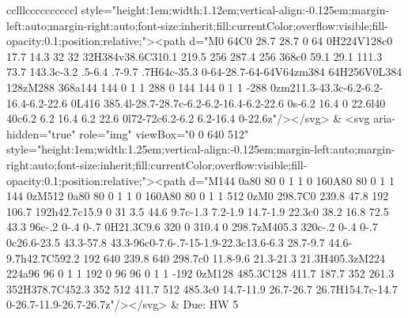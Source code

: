 \documentclass[
]{article}
\begin{document}
\begin{figure*}
\begin{longtable*}{cclllccccccccccl}
style="height:1em;width:1.12em;vertical-align:-0.125em;margin-left:auto;margin-right:auto;font-size:inherit;fill:currentColor;overflow:visible;fill-opacity:0.1;position:relative;"><path d="M0 64C0 28.7 28.7 0 64 0H224V128c0 17.7 14.3 32 32 32H384v38.6C310.1 219.5 256 287.4 256 368c0 59.1 29.1 111.3 73.7 143.3c-3.2 .5-6.4 .7-9.7 .7H64c-35.3 0-64-28.7-64-64V64zm384 64H256V0L384 128zM288 368a144 144 0 1 1 288 0 144 144 0 1 1 -288 0zm211.3-43.3c-6.2-6.2-16.4-6.2-22.6 0L416 385.4l-28.7-28.7c-6.2-6.2-16.4-6.2-22.6 0s-6.2 16.4 0 22.6l40 40c6.2 6.2 16.4 6.2 22.6 0l72-72c6.2-6.2 6.2-16.4 0-22.6z"/></svg> & <svg aria-hidden="true" role="img" viewBox="0 0 640 512" style="height:1em;width:1.25em;vertical-align:-0.125em;margin-left:auto;margin-right:auto;font-size:inherit;fill:currentColor;overflow:visible;fill-opacity:0.1;position:relative;"><path d="M144 0a80 80 0 1 1 0 160A80 80 0 1 1 144 0zM512 0a80 80 0 1 1 0 160A80 80 0 1 1 512 0zM0 298.7C0 239.8 47.8 192 106.7 192h42.7c15.9 0 31 3.5 44.6 9.7c-1.3 7.2-1.9 14.7-1.9 22.3c0 38.2 16.8 72.5 43.3 96c-.2 0-.4 0-.7 0H21.3C9.6 320 0 310.4 0 298.7zM405.3 320c-.2 0-.4 0-.7 0c26.6-23.5 43.3-57.8 43.3-96c0-7.6-.7-15-1.9-22.3c13.6-6.3 28.7-9.7 44.6-9.7h42.7C592.2 192 640 239.8 640 298.7c0 11.8-9.6 21.3-21.3 21.3H405.3zM224 224a96 96 0 1 1 192 0 96 96 0 1 1 -192 0zM128 485.3C128 411.7 187.7 352 261.3 352H378.7C452.3 352 512 411.7 512 485.3c0 14.7-11.9 26.7-26.7 26.7H154.7c-14.7 0-26.7-11.9-26.7-26.7z"/></svg> & Due: HW 5 \\ 

\end{longtable*}
\end{figure*}
\end{document}
